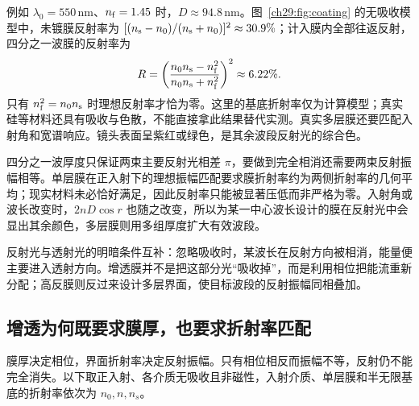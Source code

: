 \begin{center}\begin{minipage}{\linewidth}\centering{}\end{minipage}\end{center}

例如 $\lambda_0=550\,\mathrm{nm}$、$n_{\rm f}=1.45$ 时，$D\approx94.8\,\mathrm{nm}$。图~\ref{ch29:fig:coating} 的无吸收模型中，未镀膜反射率为 $[(n_{\rm s}-n_0)/(n_{\rm s}+n_0)]^2\approx30.9\%$；计入膜内全部往返反射，四分之一波膜的反射率为
\[
 R=\left(\frac{n_0n_{\rm s}-n_{\rm f}^2}{n_0n_{\rm s}+n_{\rm f}^2}\right)^2\approx6.22\%.
\]
只有 $n_{\rm f}^2=n_0n_{\rm s}$ 时理想反射率才恰为零。这里的基底折射率仅为计算模型；真实硅等材料还具有吸收与色散，不能直接拿此结果替代实测。真实多层膜还要匹配入射角和宽谱响应。镜头表面呈紫红或绿色，是其余波段反射光的综合色。

四分之一波厚度只保证两束主要反射光相差 $\pi$，要做到完全相消还需要两束反射振幅相等。单层膜在正入射下的理想振幅匹配要求膜折射率约为两侧折射率的几何平均；现实材料未必恰好满足，因此反射率只能被显著压低而非严格为零。入射角或波长改变时，$2nD\cos r$ 也随之改变，所以为某一中心波长设计的膜在反射光中会显出其余颜色，多层膜则用多组厚度扩大有效波段。

反射光与透射光的明暗条件互补：忽略吸收时，某波长在反射方向被相消，能量便主要进入透射方向。增透膜并不是把这部分光“吸收掉”，而是利用相位把能流重新分配；高反膜则反过来设计多层界面，使目标波段的反射振幅同相叠加。




\subsection{增透为何既要求膜厚，也要求折射率匹配}
膜厚决定相位，界面折射率决定反射振幅。只有相位相反而振幅不等，反射仍不能完全消失。以下取正入射、各介质无吸收且非磁性，入射介质、单层膜和半无限基底的折射率依次为 $n_0,n,n_s$。

